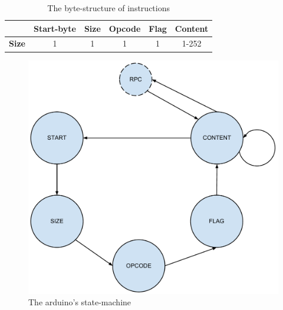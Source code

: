 \begin{table}
	\begin{tabular}{c|c|c|c|c|c|}
		\cline{2-6}
		& \textbf{Start-byte} & \textbf{Size} & \textbf{Opcode} & \textbf{Flag} & \textbf{Content} \\ \hline
		\multicolumn{1}{|c|}{\textbf{Size}} & 1 & 1 & 1 & 1 & 1-252 \\ \hline
	\end{tabular}
	\caption{The byte-structure of instructions}
	\label{tbl:instr_struct}
\end{table}

\begin{figure}
	\centering
	\includegraphics[width=\textwidth, keepaspectratio]{img/arduino_state-machine.pdf}
	\caption{The arduino's state-machine}
	\label{fig:arduino_states}
\end{figure}
